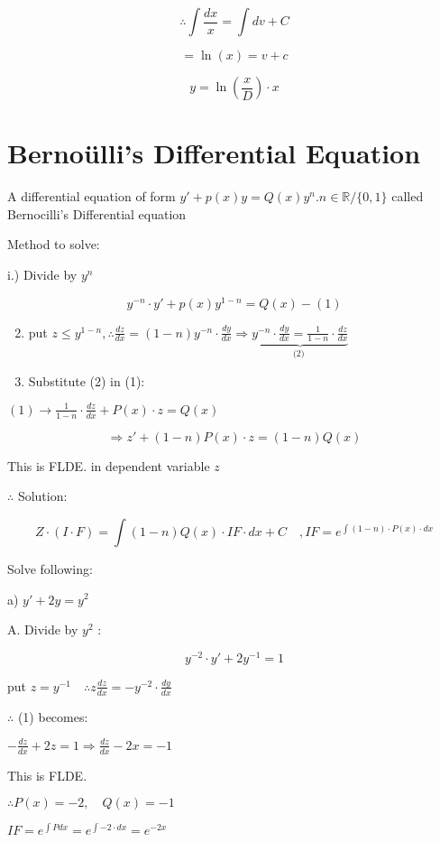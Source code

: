 \documentclass[12pt, a4paper]{article}
\begin{document}
$$
	\therefore \int \frac{d x}{x}=\int d v+C
$$

$$
	=\ln (x)=v+c
$$

$$
	y=\ln \left(\frac{x}{D}\right) \cdot x
$$

\section*{Bernoülli's Differential Equation}
A differential equation of form $y'+p(x) y=Q(x) y^{n} . n \in \mathbb{R} /\{0,1\}$ called Bernocilli's Differential equation

Method to solve:

i.) Divide by $y^{n}$

$$
	y^{-n} \cdot y'+p(x) y^{1-n}=Q(x)-(1)
$$

\begin{enumerate}
	\setcounter{enumi}{1}
	\item put $z \leq y^{1-n}, \therefore \frac{d z}{d x}=(1-n) y^{-n} \cdot \frac{d y}{d x} \Rightarrow \underbrace{y^{-n} \cdot \frac{d y}{d x}=\frac{1}{1-n} \cdot \frac{d z}{d x}}_{\text{(2) }}$

	\item Substitute (2) in (1):

\end{enumerate}

$(1) \rightarrow \frac{1}{1-n} \cdot \frac{d z}{d x}+P(x) \cdot z=Q(x)$

$$
	\Rightarrow z'+(1-n) P(x) \cdot z=(1-n) Q(x)
$$

This is FLDE. in dependent variable $z$

$\therefore$ Solution:

$$
	Z \cdot(I \cdot F)=\int(1-n) Q(x) \cdot I F \cdot d x+C \quad, I F=e^{\int(1-n) \cdot P(x) \cdot d x}
$$

Solve following:

a) $y'+2 y=y^2$

A. Divide by $y^2$ :

$$
	y^{-2} \cdot y'+2 y^{-1}=1
$$

put $z=y^{-1} \quad \therefore z \frac{d z}{d x}=-y^{-2} \cdot \frac{d y}{d x}$

$\therefore$ (1) becomes:

$-\frac{d z}{d x}+2 z=1 \Rightarrow \frac{d z}{d x}-2 x=-1$

This is FLDE.

$\therefore P(x)=-2, \quad Q(x)=-1$

$I F=e^{\int P d x}=e^{\int-2 \cdot d x}=e^{-2 x}$
\end{document}
